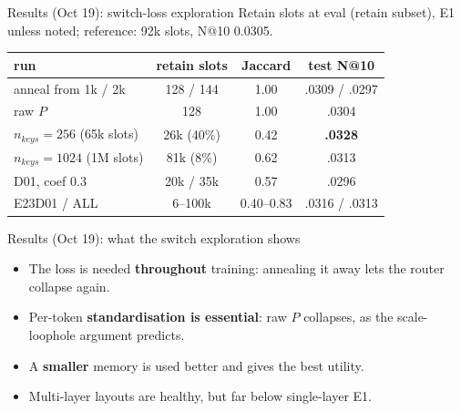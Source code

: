 \documentclass{beamer}
\begin{document}
\begin{frame}{Results (Oct 19): switch-loss exploration}
Retain slots at eval (retain subset), E1 unless noted; reference: 92k slots,
N@10 0.0305.
\begin{center}
\small
\begin{tabular}{|l|c|c|c|}
\hline
run & retain slots & Jaccard & test N@10 \\
\hline
anneal from 1k / 2k & \alert{128 / 144} & 1.00 & .0309 / .0297 \\
raw $P$ & \alert{128}       & 1.00 & .0304 \\
$n_{keys}=256$ (65k slots)    & 26k (40\%)        & 0.42 & \textbf{.0328} \\
$n_{keys}=1024$ (1M slots)    & 81k (8\%)         & 0.62 & .0313 \\
D01, coef 0.3                 & 20k / 35k          & 0.57 & .0296 \\
E23D01 / ALL & 6--100k & 0.40--0.83 & .0316 / .0313 \\
\hline
\end{tabular}
\end{center}
\end{frame}

\begin{frame}{Results (Oct 19): what the switch exploration shows}
\begin{itemize}
  \item The loss is needed \textbf{throughout} training: annealing it away lets
        the router collapse again.
  \item Per-token \textbf{standardisation is essential}: raw $P$ collapses, as
        the scale-loophole argument predicts.
  \item A \textbf{smaller} memory is used better and gives the best utility.
  \item Multi-layer layouts are healthy, but far below single-layer E1.
\end{itemize}
\end{frame}
\end{document}
